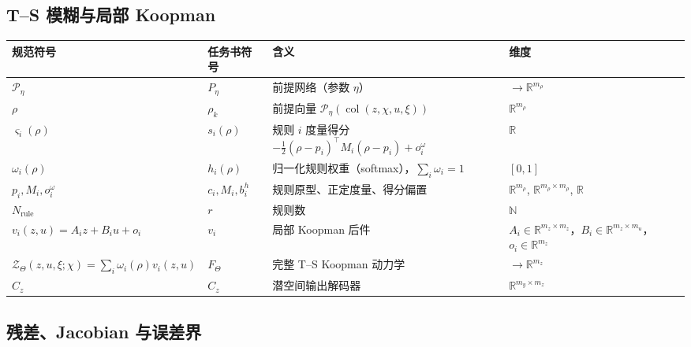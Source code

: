 \documentclass[11pt,a4paper]{ctexart}
\theoremstyle{remark}
\newcommand{\col}{\operatorname{col}}
\newcommand{\R}{\mathbb{R}}
\newcommand{\ZT}{\mathcal{Z}_{\Theta}}
\newcommand{\Prem}{\mathcal{P}_{\eta}}
\begin{document}
\subsection{T--S 模糊与局部 Koopman}

\begin{longtable}{L{0.28\textwidth}L{0.12\textwidth}L{0.32\textwidth}L{0.16\textwidth}}
\toprule
规范符号 & 任务书符号 & 含义 & 维度 \\
\midrule
\endhead
$\Prem$ & $P_\eta$ & 前提网络（参数 $\eta$） & $\to\R^{m_\rho}$ \\
$\rho$ & $\rho_k$ & 前提向量 $\Prem(\col(z,\chi,u,\xi))$ & $\R^{m_\rho}$ \\
$\varsigma_i(\rho)$ & $s_i(\rho)$ & 规则 $i$ 度量得分 $-\tfrac12(\rho-p_i)^\top M_i(\rho-p_i)+o^\omega_i$ & $\R$ \\
$\omega_i(\rho)$ & $h_i(\rho)$ & 归一化规则权重（softmax），$\sum_i\omega_i=1$ & $[0,1]$ \\
$p_i,M_i,o^\omega_i$ & $c_i,M_i,b_i^h$ & 规则原型、正定度量、得分偏置 & $\R^{m_\rho}$, $\R^{m_\rho\times m_\rho}$, $\R$ \\
$N_{\mathrm{rule}}$ & $r$ & 规则数 & $\mathbb N$ \\
$v_i(z,u)=A_iz+B_iu+o_i$ & $v_i$ & 局部 Koopman 后件 & $A_i{\in}\R^{m_z\times m_z}$，$B_i{\in}\R^{m_z\times m_u}$，$o_i{\in}\R^{m_z}$ \\
$\ZT(z,u,\xi;\chi)=\sum_i\omega_i(\rho)v_i(z,u)$ & $F_\Theta$ & 完整 T--S Koopman 动力学 & $\to\R^{m_z}$ \\
$C_z$ & $C_z$ & 潜空间输出解码器 & $\R^{m_y\times m_z}$ \\
\bottomrule
\end{longtable}

\subsection{残差、Jacobian 与误差界}
\end{document}
